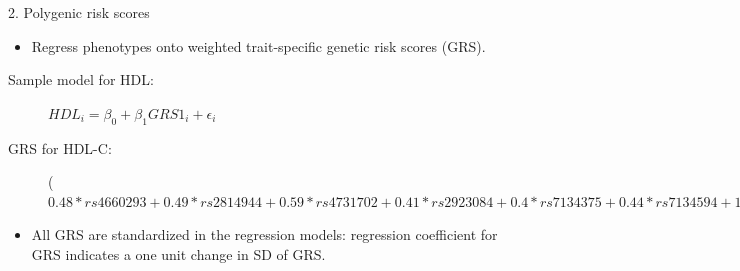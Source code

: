 \documentclass[pdf]{beamer}\usepackage[]{graphicx}\usepackage[]{color}
\begin{document}
\begin{frame}{2. Polygenic risk scores}

\begin{itemize}
  \item Regress phenotypes onto weighted trait-specific genetic risk scores (GRS).
  \end{itemize}

\begin{description}
  \item[Sample model for HDL:] $HDL_i = \beta_0 + \beta_1 GRS1_i + \epsilon_i$
  \item[GRS for HDL-C:] \scriptsize ($0.48 * rs4660293 + 0.49 * rs2814944 + 0.59 * rs4731702 + 0.41 * rs2923084 + 0.4 * rs7134375 + 0.44 * rs7134594 + 1.45 * rs1532085 + 3.39 * rs3764261 + 0.45 * rs2925979 + 0.42 * rs4148008 + 0.39 * rs4129767 + 0.64 * rs737337 + 1.88 * rs1800961 + 0.93 * rs6065906 + 0.47 * rs1689800 + 0.61 * rs4846914 + 0.68 * rs12328675 + 0.46 * rs2972146 + 0.49 * rs6450176 + 0.39 * rs605066 + 1.95 * rs1084651 + 1.21 * rs9987289 + 0.44 * rs2293889 + 0.65 * rs581080 + 0.94 * rs1883025 + 0.78 * rs3136441 + 0.86 * rs4759375 + 0.44 * rs4765127 + 0.61 * rs838880 + 0.39 * rs2652834 + 1.27 * rs16942887 + 0.48 * rs11869286 + 1.31 * rs7241918 + 0.42 * rs12967135 + 0.45 * rs7255436 + 0.83 * rs386000 + 0.46 * rs181362 + 0.84 * rs13107325) / 29.79$
\end{description}

\begin{itemize}
  \item All GRS are standardized in the regression models: regression coefficient for GRS indicates a one unit change in SD of GRS.
  \end{itemize}
  
\end{frame}
  
\end{document}
